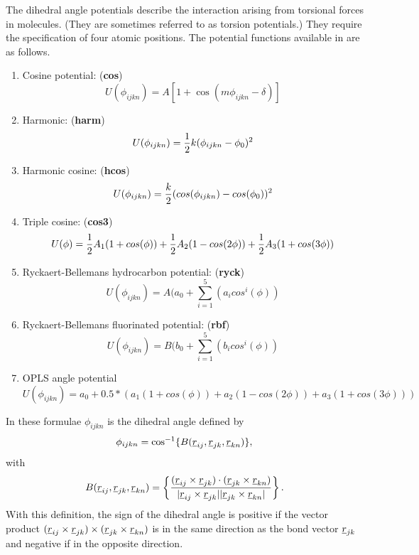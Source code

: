 The dihedral angle potentials describe the interaction arising from
torsional forces in molecules. (They are sometimes referred to as
torsion potentials.) They require the specification of four atomic
positions.  The potential functions available in \D{} are as
follows.
\begin{enumerate}
\item Cosine potential: ({\bf cos})
\begin{equation}
U(\phi_{ijkn})= A \left [ 1 + \cos (m\phi_{ijkn} - \delta)\right] 
\end{equation}
\item Harmonic: ({\bf harm})
\begin{equation}
U(\phi_{ijkn})= {1\over 2} k (\phi_{ijkn} - \phi_0)^2 
\end{equation}
\item Harmonic cosine: ({\bf hcos})
\begin{equation}
U(\phi_{ijkn})={k\over 2}(cos(\phi_{ijkn}) -cos(\phi_{0}))^{2}
\end{equation}
\item Triple cosine: ({\bf cos3})
\begin{equation}
U(\phi)={1\over 2}A_{1}(1+cos(\phi))+{1\over 2}A_{2}(1-cos(2\phi))+
{1\over 2}A_{3}(1+cos(3\phi))
\end{equation}
\item Ryckaert-Bellemans hydrocarbon potential: ({\bf ryck})
\begin{equation}
U(\phi_{ijkn})=A(a_0+\sum_{i=1}^{5}(a_i cos^i(\phi))
\end{equation}
\item Ryckaert-Bellemans fluorinated potential: ({\bf rbf})
\begin{equation}
U(\phi_{ijkn})=B(b_0+\sum_{i=1}^{5}(b_i cos^i(\phi))
\end{equation}
\item OPLS angle potential
\begin{equation} 
U(\phi_{ijkn})=a_0+0.5*(a_1(1+cos(\phi))+a_2(1-cos(2\phi))+a_3(1+cos(3\phi)))
\end{equation}

\end{enumerate}
In these formulae $\phi_{ijkn}$ is the dihedral angle defined by
\begin{equation}
\phi_{ijkn}=\cos^{-1}\{B(\mbox{$\underline{r}$}_{ij},\mbox{$\underline{r}$}_{jk},\mbox{$\underline{r}$}_{kn})\},
\end{equation}
with
\begin{equation}
B(\mbox{$\underline{r}$}_{ij},\mbox{$\underline{r}$}_{jk},\mbox{$\underline{r}$}_{kn})=
\left\{\frac{
(\mbox{$\underline{r}$}_{ij}\times\mbox{$\underline{r}$}_{jk})\cdot(\mbox{$\underline{r}$}_{jk}\times\mbox{$\underline{r}$}_{kn})}
{|\mbox{$\underline{r}$}_{ij}\times\mbox{$\underline{r}$}_{jk}||\mbox{$\underline{r}$}_{jk}\times\mbox{$\underline{r}$}_{kn}|}
\right\}.
\end{equation}
With this definition, the sign of the dihedral angle is positive if
the
vector product
$(\mbox{$\underline{r}$}_{ij}\times\mbox{$\underline{r}$}_{jk})\times(\mbox{$\underline{r}$}_{jk}\times\mbox{$\underline{r}$}_{kn})$
is in the same direction as the bond vector $\mbox{$\underline{r}$}_{jk}$ and
negative
if in the opposite direction.

